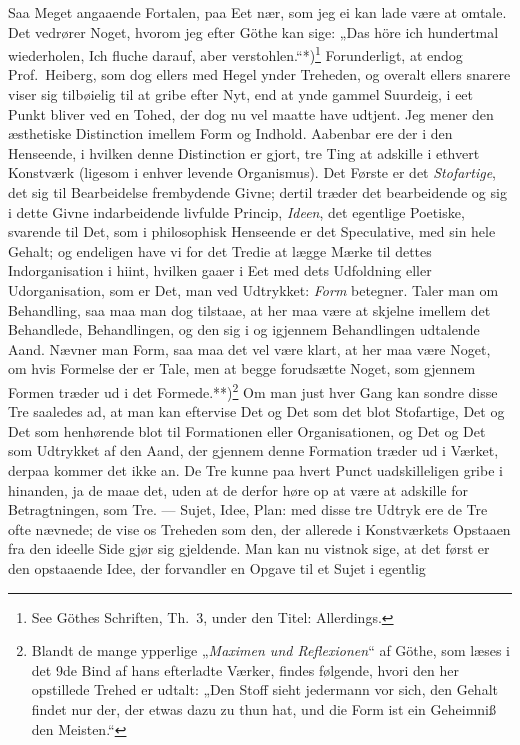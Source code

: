 \documentclass[12pt,a4paper]{book}
\newcommand{\apage}[1]{\marginnote{\footnotesize\textit{[#1]}}}
\begin{document}
Saa Meget angaaende Fortalen, paa Eet nær, som jeg ei kan lade være at
omtale. Det vedrører Noget, hvorom jeg efter Göthe kan sige: „Das höre
ich hundertmal wiederholen, Ich fluche darauf, aber
verstohlen.“*)\footnote{See Göthes Schriften, Th.\ 3, under den Titel:
Allerdings.} Forunderligt, at endog Prof.\ Heiberg, som dog ellers med
Hegel ynder Treheden, og overalt ellers snarere viser sig tilbøielig til
at gribe efter Nyt, end at ynde gammel Suurdeig, i eet Punkt bliver ved en
Tohed, der dog nu vel maatte have udtjent. Jeg mener den æsthetiske
Distinction imellem Form og Indhold. Aabenbar ere der i den Henseende, i
hvilken denne Distinction er gjort, tre Ting at adskille i ethvert
Konstværk (ligesom i enhver levende Organismus). Det Første er det
\emph{Stofartige}, det sig til Bearbeidelse frembydende Givne; dertil træder det
bearbeidende og sig i dette Givne indarbeidende livfulde Princip, \emph{Ideen},
det egentlige Poetiske, svarende til Det, som i philosophisk Henseende er
det Speculative, med sin hele Gehalt; og endeligen have vi for det Tredie
at lægge Mærke til dettes Indorganisation i hiint, hvilken gaaer i Eet med
dets Udfoldning eller Udorganisation, som er Det, man ved Udtrykket: \emph{Form}
betegner. Taler man om Behandling, saa maa man dog tilstaae, at her maa
være at skjelne imellem det Behandlede, Behandlingen, og den sig i og
igjennem Behandlingen udtalende Aand. Nævner man Form, saa maa det vel
være klart, at her maa være Noget, om hvis Formelse der er Tale, men at
begge forudsætte Noget, som gjennem Formen træder ud i det
Formede.**)\footnote{Blandt de mange ypperlige „\emph{Maximen und Reflexionen}“
af Göthe, som læses i det 9de Bind af hans efterladte Værker, findes
følgende, hvori den her opstillede Trehed er udtalt: „Den Stoff sieht
jedermann vor sich, den Gehalt findet nur der, der etwas dazu zu thun hat,
und die Form ist ein Geheimniß den Meisten.“} Om man
\apage{4} just hver Gang kan sondre disse Tre saaledes ad, at man kan eftervise Det
og Det som det blot Stofartige, Det og Det som henhørende blot til
Formationen eller Organisationen, og Det og Det som Udtrykket af den Aand,
der gjennem denne Formation træder ud i Værket, derpaa kommer det ikke an.
De Tre kunne paa hvert Punct uadskilleligen gribe i hinanden, ja de maae
det, uden at de derfor høre op at være at adskille for Betragtningen, som
Tre. --- Sujet, Idee, Plan: med disse tre Udtryk ere de Tre ofte nævnede;
de vise os Treheden som den, der allerede i Konstværkets Opstaaen fra den
ideelle Side gjør sig gjeldende. Man kan nu vistnok sige, at det først er
den opstaaende Idee, der forvandler en Opgave til et Sujet i egentlig
\end{document}
